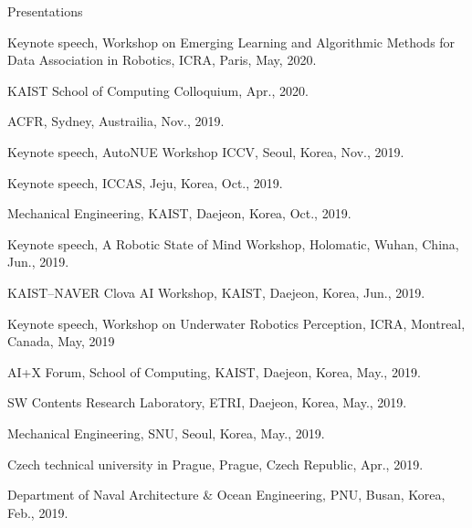 \begin{rSection}{Presentations}

\begin{pubSubsectionNum}{}
  \item Keynote speech, Workshop on Emerging Learning and Algorithmic Methods for Data Association in Robotics, ICRA, Paris, May, 2020.

  \item KAIST School of Computing Colloquium, Apr., 2020.


  \item \ac{ACFR}, Sydney, Austrailia, Nov., 2019.

  \item Keynote speech, AutoNUE Workshop \ac{ICCV}, Seoul, Korea,  Nov., 2019.

  \item Keynote speech, \ac{ICCAS}, Jeju, Korea, Oct., 2019.

  \item Mechanical Engineering, \ac{KAIST}, Daejeon, Korea, Oct., 2019.

  \item Keynote speech, A Robotic State of Mind Workshop, Holomatic, Wuhan, China, Jun., 2019.

  \item KAIST--NAVER Clova AI Workshop, \ac{KAIST}, Daejeon, Korea, Jun., 2019.

  \item Keynote speech, Workshop on Underwater Robotics Perception, ICRA, Montreal, Canada, May, 2019

  \item AI+X Forum, School of Computing, \ac{KAIST}, Daejeon, Korea, May., 2019.

  \item SW Contents Research Laboratory, \ac{ETRI}, Daejeon, Korea, May., 2019.

  \item Mechanical Engineering, \ac{SNU}, Seoul, Korea, May., 2019.

  \item Czech technical university in Prague, Prague, Czech Republic, Apr., 2019.

  \item Department of Naval Architecture \& Ocean Engineering, \ac{PNU}, Busan, Korea, Feb., 2019.


\end{pubSubsectionNum}
\end{rSection}
